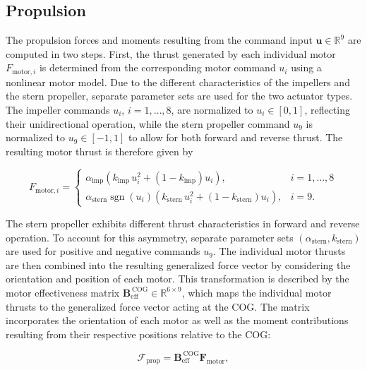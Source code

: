 \subsection{Propulsion}
\label{sec:2.2.3Propulsion}

The propulsion forces and moments resulting from the command input $\bm{u} \in \mathbb{R}^9$ are computed in two steps. 
First, the thrust generated by each individual motor $F_{\mathrm{motor}, i}$ is determined from the corresponding motor command $u_i$ using a nonlinear motor model. Due to the different characteristics of the impellers and the stern propeller, separate parameter sets are used for the two actuator types.
The impeller commands $u_i$, $i=1,\dots,8$, are normalized to $u_i \in [0,1]$, reflecting their unidirectional operation, while the stern propeller command $u_9$ is normalized to $u_9 \in [-1,1]$ to allow for both forward and reverse thrust.
The resulting motor thrust is therefore given by

\begin{equation}
	F_{\mathrm{motor},i}
	=
	\begin{cases}
		\alpha_{\mathrm{imp}}
		\left(	k_{\mathrm{imp}} \, u_i^2
		+
		(1-k_{\mathrm{imp}})u_i \right),
		& i = 1,\dots,8
		\\[1.5ex]
		\alpha_{\mathrm{stern}} \operatorname{sgn}(u_i)
		\left( k_{\mathrm{stern}} \, u_i^2
		+
		(1-k_{\mathrm{stern}})u_i \right),
		& i = 9.
	\end{cases}
\end{equation}

The stern propeller exhibits different thrust characteristics in forward and reverse operation. To account for this asymmetry, separate parameter sets $(\alpha_{\mathrm{stern}}, k_{\mathrm{stern}})$ are used for positive and negative commands $u_9$.
The individual motor thrusts are then combined into the resulting
generalized force vector by considering the orientation and position of each
motor. This transformation is described by the motor effectiveness matrix
$\bm{B}_\mathrm{eff}^{\,\mathrm{COG}} \in \mathbb{R}^{6 \times 9}$, which
maps the individual motor thrusts to the generalized force vector acting at the COG. The matrix
incorporates the orientation of each motor as well as the moment contributions
resulting from their respective positions relative to the COG:


\begin{equation}
	\bm{\mathcal{F}}_\mathrm{prop}
	=
	\bm{B}_\mathrm{eff}^{\,\mathrm{COG}}
	\bm{F}_\mathrm{motor},
\end{equation}

